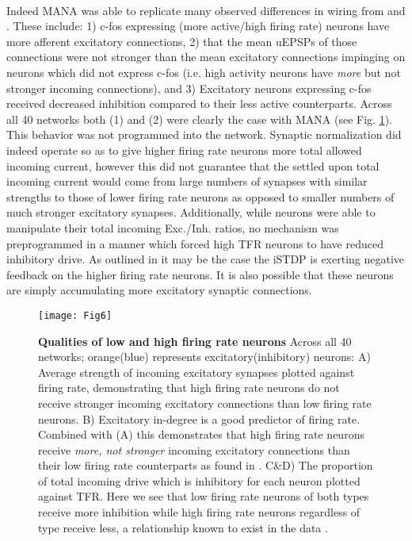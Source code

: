 \documentclass[10pt,letterpaper]{article}
\begin{document}
\paragraph{}
Indeed MANA was able to replicate many observed differences in wiring from \cite{yassin2010embedded} and \cite{benedetti2012differential}. These include: 1) c-fos expressing (more active/high firing rate) neurons have more afferent excitatory connections, 2) that the mean uEPSPs of those connections were not stronger than the mean excitatory connections impinging on neurons which did not express c-fos (i.e. high activity neurons have \emph{more} but not stronger incoming connections), and 3) Excitatory neurons expressing c-fos received decreased inhibition compared to their less active counterparts. Across all 40 networks both (1) and (2) were clearly the case with MANA (see Fig. \ref{Fig6}). This behavior was not programmed into the network. Synaptic normalization did indeed operate so as to give higher firing rate neurons more total allowed incoming current, however this did not guarantee that the settled upon total incoming current would come from large numbers of synapses with similar strengths to those of lower firing rate neurons as opposed to smaller numbers of much stronger excitatory synapses. Additionally, while neurons were able to manipulate their total incoming Exc./Inh. ratios, no mechanism was preprogrammed in a manner which forced high TFR neurons to have reduced inhibitory drive. As outlined in \cite{Luz2012} it may be the case the iSTDP is exerting negative feedback  on the higher firing rate neurons. It is also possible that these neurons are simply accumulating more excitatory synaptic connections.

\begin{figure}[!h]
	\texttt{[image: Fig6]}
	\caption{{\bf Qualities of low and high firing rate neurons}
		   Across all 40 networks; orange(blue) represents excitatory(inhibitory) neurons: A) Average strength of incoming excitatory synapses plotted against firing rate, demonstrating that high firing rate neurons do not receive stronger incoming excitatory connections than low firing rate neurons. B) Excitatory in-degree is a good predictor of firing rate. Combined with (A) this demonstrates that high firing rate neurons receive \emph{more, not stronger} incoming excitatory connections than their low firing rate counterparts as found in \cite{benedetti2012differential}. C\&D) The proportion of total incoming drive which is inhibitory for each neuron plotted against TFR. Here we see that low firing rate neurons of both types receive more inhibition while high firing rate neurons regardless of type receive less, a relationship known to exist in the data \cite{benedetti2012differential}\cite{yassin2010embedded}. }
	\label{Fig6}
\end{figure}
\end{document}
